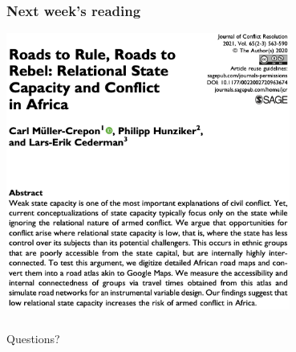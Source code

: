 \documentclass[aspectratio=43]{beamer}
\begin{document}
\begin{frame}
\frametitle{Next week's reading}
\centering

\includegraphics[width = 0.7\textwidth]{img/mullercrepon}

\end{frame}

\begin{frame}
\frametitle{}
\centering

Questions?

\end{frame}


\end{document}
